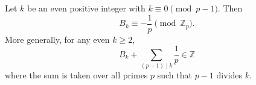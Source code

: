 Let $k$ be an even positive integer with $k \equiv 0 \pmod{p-1}$. Then
$$
B_k \equiv -\frac{1}{p} \pmod{\mathbb{Z}_p}.
$$
More generally, for any even $k \geq 2$,
$$
B_k + \sum_{(p-1) \mid k} \frac{1}{p} \in \mathbb{Z}
$$
where the sum is taken over all primes $p$ such that $p-1$ divides $k$.
